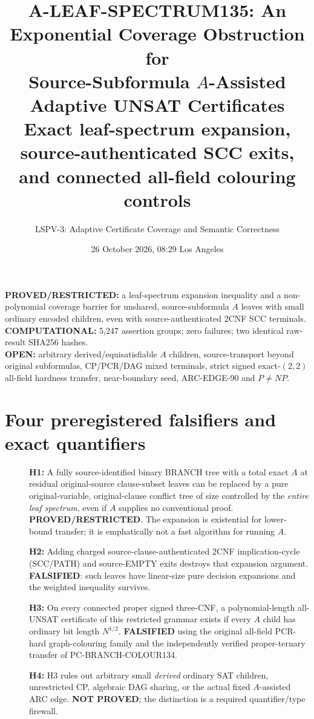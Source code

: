 \documentclass[11pt]{article}
\title{A-LEAF-SPECTRUM135: An Exponential Coverage Obstruction for\\Source-Subformula $A$-Assisted Adaptive UNSAT Certificates\\\large Exact leaf-spectrum expansion, source-authenticated SCC exits, and connected all-field colouring controls}
\author{LSPV-3: Adaptive Certificate Coverage and Semantic Correctness}
\date{26 October 2026, 08:29 Los Angeles}
\begin{document}
\maketitle
\begin{center}
\textbf{PROVED/RESTRICTED:} a leaf-spectrum expansion inequality and a non-polynomial coverage barrier for unshared, source-subformula $A$ leaves with small ordinary encoded children, even with source-authenticated 2CNF SCC terminals.\\
\textbf{COMPUTATIONAL:} 5,247 assertion groups; zero failures; two identical raw-result SHA256 hashes.\\
\textbf{OPEN:} arbitrary derived/equisatisfiable $A$ children, source-transport beyond original subformulas, CP/PCR/DAG mixed terminals, strict signed exact-$(2,2)$ all-field hardness transfer, near-boundary seed, ARC-EDGE-90 and $P\ne NP$.
\end{center}

\section{Four preregistered falsifiers and exact quantifiers}
\begin{description}
\item[] \textbf{H1:} A fully source-identified binary BRANCH tree with a total exact $A$ at residual original-source clause-subset leaves can be replaced by a pure original-variable, original-clause conflict tree of size controlled by the \emph{entire leaf spectrum}, even if $A$ supplies no conventional proof. \textbf{PROVED/RESTRICTED}. The expansion is existential for lower-bound transfer; it is emphatically not a fast algorithm for running $A$.
\item[] \textbf{H2:} Adding charged source-clause-authenticated 2CNF implication-cycle (SCC/PATH) and source-EMPTY exits destroys that expansion argument. \textbf{FALSIFIED}: such leaves have linear-size pure decision expansions and the weighted inequality survives.
\item[] \textbf{H3:} On every connected proper signed three-CNF, a polynomial-length all-UNSAT certificate of this restricted grammar exists if every $A$ child has ordinary bit length $N^{1/2}$. \textbf{FALSIFIED} using the original all-field PCR-hard graph-colouring family and the independently verified proper-ternary transfer of PC-BRANCH-COLOUR134.
\item[] \textbf{H4:} H3 rules out arbitrary small \emph{derived} ordinary SAT children, unrestricted CP, algebraic DAG sharing, or the actual fixed $A$-assisted ARC edge. \textbf{NOT PROVED}; the distinction is a required quantifier/type firewall.
\end{description}
\end{document}
